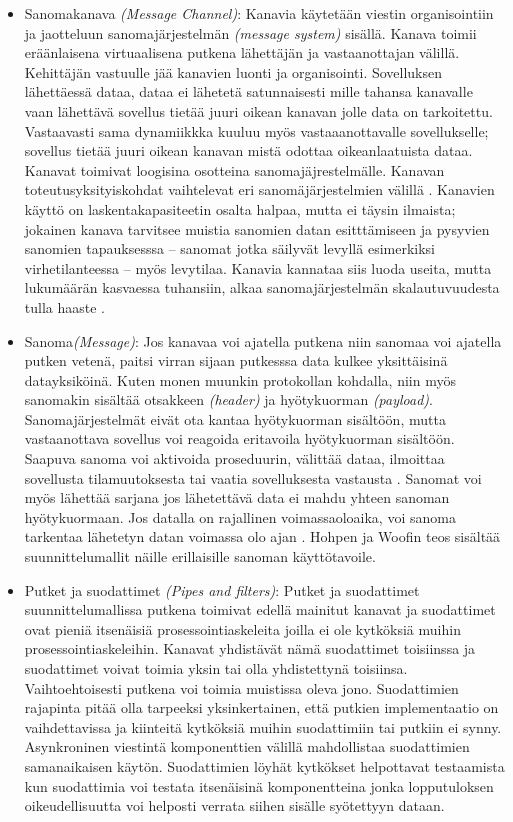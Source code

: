 \begin{itemize}
   \item Sanomakanava \textit{(Message Channel)}:
      Kanavia käytetään viestin organisointiin ja jaotteluun sanomajärjestelmän \textit{(message system)} sisällä. Kanava toimii eräänlaisena virtuaalisena putkena lähettäjän ja vastaanottajan välillä. Kehittäjän vastuulle jää kanavien luonti ja organisointi. Sovelluksen lähettäessä dataa, dataa ei lähetetä satunnaisesti mille tahansa kanavalle vaan lähettävä sovellus tietää juuri oikean kanavan jolle data on tarkoitettu. Vastaavasti sama dynamiikkka kuuluu myös vastaaanottavalle sovellukselle; sovellus tietää juuri oikean kanavan mistä odottaa oikeanlaatuista dataa.
      Kanavat toimivat loogisina osotteina sanomajäjrestelmälle. Kanavan toteutusyksityiskohdat vaihtelevat eri sanomäjärjestelmien välillä \citep{EnterpriseIntegration} \citep{Hohpe2004}.
      Kanavien käyttö on laskentakapasiteetin osalta halpaa, mutta ei täysin ilmaista; jokainen kanava tarvitsee muistia sanomien datan esitttämiseen ja pysyvien sanomien tapauksesssa -- sanomat jotka säilyvät levyllä esimerkiksi virhetilanteessa -- myös levytilaa. Kanavia kannataa siis luoda useita, mutta lukumäärän kasvaessa tuhansiin, alkaa sanomajärjestelmän skalautuvuudesta tulla haaste \citep{Hohpe2004}.
   \item Sanoma\textit{(Message)}:
      Jos kanavaa voi ajatella putkena niin sanomaa voi ajatella putken vetenä, paitsi virran sijaan putkesssa data kulkee yksittäisinä datayksiköinä. Kuten monen muunkin protokollan kohdalla, niin myös sanomakin sisältää otsakkeen \textit{(header)} ja  hyötykuorman \textit{(payload)}. Sanomajärjestelmät eivät ota kantaa hyötykuorman sisältöön, mutta vastaanottava sovellus voi reagoida eritavoila hyötykuorman sisältöön. Saapuva sanoma voi aktivoida proseduurin, välittää dataa, ilmoittaa sovellusta tilamuutoksesta tai vaatia sovelluksesta vastausta \citep{Hohpe2004}. Sanomat voi myös lähettää sarjana jos lähetettävä data ei mahdu yhteen sanoman hyötykuormaan. Jos datalla on rajallinen voimassaoloaika, voi sanoma tarkentaa lähetetyn datan voimassa olo ajan \citep{Hohpe2004}. Hohpen ja Woofin teos sisältää suunnittelumallit näille erillaisille sanoman käyttötavoile.

   \newpage
   \item Putket ja suodattimet \textit{(Pipes and filters)}:
      Putket ja suodattimet suunnittelumallissa putkena toimivat edellä mainitut kanavat ja suodattimet ovat pieniä itsenäisiä prosessointiaskeleita joilla ei ole kytköksiä muihin prosessointiaskeleihin. Kanavat yhdistävät nämä suodattimet toisiinssa ja suodattimet voivat toimia yksin tai olla yhdistettynä toisiinsa. Vaihtoehtoisesti putkena voi toimia muistissa oleva jono. Suodattimien rajapinta pitää olla tarpeeksi yksinkertainen, että putkien implementaatio on vaihdettavissa ja kiinteitä kytköksiä muihin suodattimiin tai putkiin ei synny.
      Asynkroninen viestintä komponenttien välillä mahdollistaa suodattimien samanaikaisen käytön.
   Suodattimien löyhät kytkökset helpottavat testaamista kun suodattimia voi testata itsenäisinä komponentteina jonka lopputuloksen oikeudellisuutta voi helposti verrata siihen sisälle syötettyyn dataan.



\end{itemize}
